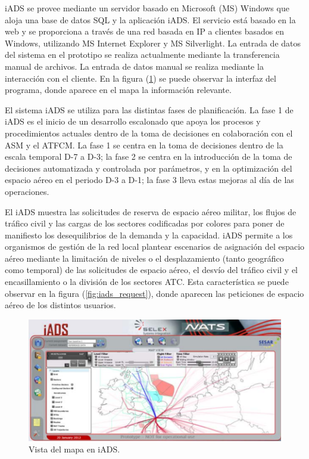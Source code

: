 iADS se provee mediante un servidor basado en Microsoft (MS) Windows que aloja una base de datos SQL y la aplicación iADS. El servicio está basado en la web y se proporciona a través de una red basada en IP a clientes basados en Windows, utilizando MS Internet Explorer y MS Silverlight. La entrada de datos del sistema en el prototipo se realiza actualmente mediante la transferencia manual de archivos. La entrada de datos manual se realiza mediante la interacción con el cliente. En la figura (\ref{fig:iads_map}) se puede observar la interfaz del programa, donde aparece en el mapa la información relevante.

El sistema iADS se utiliza para las distintas fases de planificación. La fase 1 de iADS es el inicio de un desarrollo escalonado que apoya los procesos y procedimientos actuales dentro de la toma de decisiones en colaboración con el ASM y el ATFCM. La fase 1 se centra en la toma de decisiones dentro de la escala temporal D-7 a D-3; la fase 2 se centra en la introducción de la toma de decisiones automatizada y controlada por parámetros, y en la optimización del espacio aéreo en el periodo D-3 a D-1; la fase 3 lleva estas mejoras al día de las operaciones. 

El iADS muestra las solicitudes de reserva de espacio aéreo militar, los flujos de tráfico civil y las cargas de los sectores codificadas por colores para poner de manifiesto los desequilibrios de la demanda y la capacidad. iADS permite a los organismos de gestión de la red local plantear escenarios de asignación del espacio aéreo mediante la limitación de niveles o el desplazamiento (tanto geográfico como temporal) de las solicitudes de espacio aéreo, el desvío del tráfico civil y el encasillamiento o la división de los sectores ATC. Esta característica se puede observar en la figura (\ref{fig:iads_request}), donde aparecen las peticiones de espacio aéreo de los distintos usuarios.

\begin{figure}[H]
    \centering
    \includegraphics[width=1\linewidth]{figuras/iads_map.png}
    \caption{Vista del mapa en iADS.}
    \label{fig:iads_map}
\end{figure}


